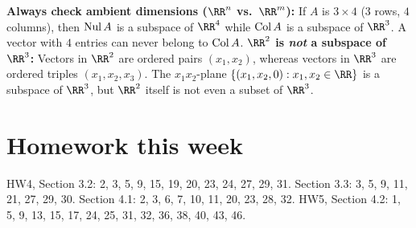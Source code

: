 \documentclass[10pt]{scrartcl}
\begin{document}
\begin{trapbox}
  \ii \textbf{Always check ambient dimensions ($\RR^n$ vs.\ $\RR^m$):} If $A$ is $3\times 4$ ($3$ rows, $4$ columns), then $\operatorname{Nul} A$ is a subspace of $\RR^4$ while $\operatorname{Col} A$ is a subspace of $\RR^3$. A vector with $4$ entries can never belong to $\operatorname{Col} A$.
  \ii \textbf{$\RR^2$ is \emph{not} a subspace of $\RR^3$:} Vectors in $\RR^2$ are ordered pairs $(x_1,x_2)$, whereas vectors in $\RR^3$ are ordered triples $(x_1,x_2,x_3)$. The $x_1x_2$-plane $\{(x_1,x_2,0):x_1,x_2\in\RR\}$ is a subspace of $\RR^3$, but $\RR^2$ itself is not even a subset of $\RR^3$.
\end{trapbox}

\section{Homework this week}
HW4, Section 3.2: 2, 3, 5, 9, 15, 19, 20, 23, 24, 27, 29, 31. Section 3.3: 3, 5, 9, 11, 21, 27, 29, 30. Section 4.1: 2, 3, 6, 7, 10, 11, 20, 23, 28, 32. HW5, Section 4.2: 1, 5, 9, 13, 15, 17, 24, 25, 31, 32, 36, 38, 40, 43, 46.
\end{document}
